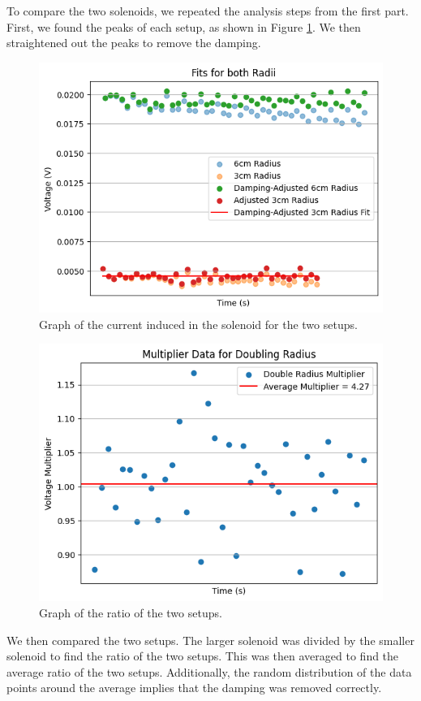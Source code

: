 \documentclass[11pt]{article}
\begin{document}
    To compare the two solenoids, we repeated the analysis steps from the first part.
    First, we found the peaks of each setup, as shown in Figure \ref{fig:part2_peaks}.
    We then straightened out the peaks to remove the damping.

    \begin{figure}[H]
        \centering
        \includegraphics[width=0.8\linewidth]{resources/images/part2 damping}
        \caption{Graph of the current induced in the solenoid for the two setups.}
        \label{fig:part2_peaks}
    \end{figure}

    \begin{figure}[H]
        \centering
        \includegraphics[width=0.65\linewidth]{resources/images/part2 ratios}
        \caption{Graph of the ratio of the two setups.}
        \label{fig:part2_ratios}
    \end{figure}

    We then compared the two setups.
    The larger solenoid was divided by the smaller solenoid to find the ratio of the two setups.
    This was then averaged to find the average ratio of the two setups.
    Additionally, the random distribution of the data points around the average implies that the damping was removed correctly.
\end{document}
